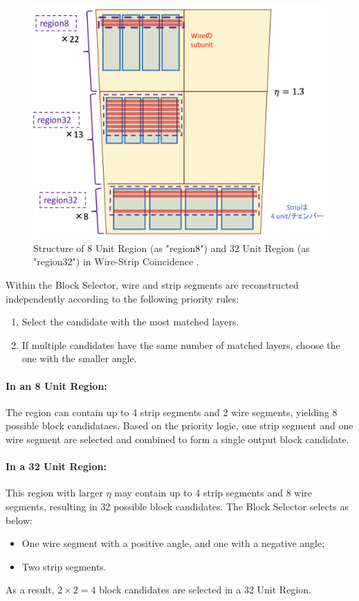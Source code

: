 \begin{figure}[htbp]
  \centering
  \includegraphics[width=1.0\textwidth]{figs/chapter5/wsc_region.png}
  \caption{Structure of 8 Unit Region (as "region8") and 32 Unit Region (as "region32") in Wire-Strip Coincidence \cite{yamashita}.}
  \label{fig:wsc_region}
\end{figure}

Within the Block Selector, wire and strip segments are reconstructed independently according to the following priority rules:
\begin{enumerate}
  \item Select the candidate with the most matched layers.
  \item If multiple candidates have the same number of matched layers, choose the one with the smaller angle.
\end{enumerate}

\paragraph{In an 8 Unit Region:}  
The region can contain up to 4 strip segments and 2 wire segments, yielding 8 possible block candidataes. Based on the priority logic, one strip segment and one wire segment are selected and combined to form a single output block candidate.

\paragraph{In a 32 Unit Region:}  
This region with larger $\eta$ may contain up to 4 strip segments and 8 wire segments, resulting in 32 possible block candidates. The Block Selector selects as below:
\begin{itemize}
  \item One wire segment with a positive angle, and one with a negative angle;
  \item Two strip segments.
\end{itemize}
As a result, $2 \times 2 = 4$ block candidates are selected in a 32 Unit Region.

